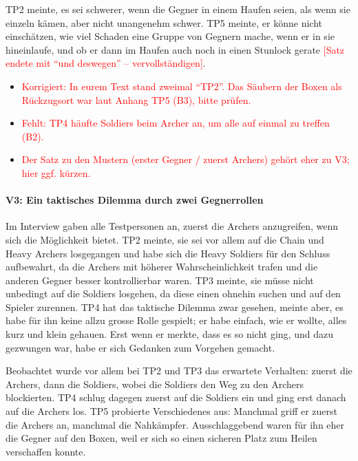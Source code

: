 \documentclass[../Main.tex]{subfiles}
\begin{document}
TP2 meinte, es sei schwerer, wenn die Gegner in einem Haufen seien, als wenn sie einzeln kämen, aber nicht unangenehm schwer. TP5 meinte, er könne nicht einschätzen, wie viel Schaden eine Gruppe von Gegnern mache, wenn er in sie hineinlaufe, und ob er dann im Haufen auch noch in einen Stunlock gerate \textcolor{red}{[Satz endete mit \enquote{und deswegen} -- vervollständigen]}.

\begin{itemize}[leftmargin=1.5cm]
    \item \textcolor{red}{Korrigiert: In eurem Text stand zweimal \enquote{TP2}. Das Säubern der Boxen als Rückzugsort war laut Anhang TP5 (B3), bitte prüfen.}
    \item \textcolor{red}{Fehlt: TP4 häufte Soldiers beim Archer an, um alle auf einmal zu treffen (B2).}
    \item \textcolor{red}{Der Satz zu den Mustern (erster Gegner / zuerst Archers) gehört eher zu V3; hier ggf. kürzen.}
\end{itemize}

\paragraph{V3: Ein taktisches Dilemma durch zwei Gegnerrollen}
Im Interview gaben alle Testpersonen an, zuerst die Archers anzugreifen, wenn sich die Möglichkeit bietet. TP2 meinte, sie sei vor allem auf die Chain und Heavy Archers losgegangen und habe sich die Heavy Soldiers für den Schluss aufbewahrt, da die Archers mit höherer Wahrscheinlichkeit trafen und die anderen Gegner besser kontrollierbar waren. TP3 meinte, sie müsse nicht unbedingt auf die Soldiers losgehen, da diese einen ohnehin suchen und auf den Spieler zurennen. TP4 hat das taktische Dilemma zwar gesehen, meinte aber, es habe für ihn keine allzu grosse Rolle gespielt; er habe einfach, wie er wollte, alles kurz und klein gehauen. Erst wenn er merkte, dass es so nicht ging, und dazu gezwungen war, habe er sich Gedanken zum Vorgehen gemacht.

Beobachtet wurde vor allem bei TP2 und TP3 das erwartete Verhalten: zuerst die Archers, dann die Soldiers, wobei die Soldiers den Weg zu den Archers blockierten. TP4 schlug dagegen zuerst auf die Soldiers ein und ging erst danach auf die Archers los. TP5 probierte Verschiedenes aus: Manchmal griff er zuerst die Archers an, manchmal die Nahkämpfer. Ausschlaggebend waren für ihn eher die Gegner auf den Boxen, weil er sich so einen sicheren Platz zum Heilen verschaffen konnte.
\end{document}
